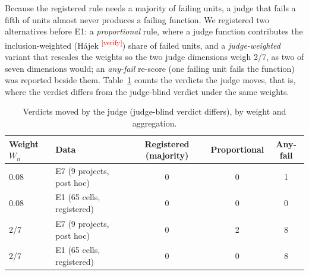 \documentclass[10pt,a4paper]{article}
\newcommand{\citeneeded}[1]{\cite{#1}\textsuperscript{\textcolor{red}{\tiny[verify]}}}
\newcommand{\Wn}{W_n}
\begin{document}
Because the registered rule needs a majority of failing units, a judge that fails a fifth of units almost never
produces a failing function. We registered two alternatives before E1: a \emph{proportional} rule, where a judge
function contributes the inclusion-weighted (H\'ajek \citeneeded{horvitz1952}) share of failed units, and a
\emph{judge-weighted} variant that rescales the weights so the two judge dimensions weigh 2/7, as two of seven
dimensions would; an \emph{any-fail} re-score (one failing unit fails the function) was reported beside them.
Table~\ref{tab:matter} counts the verdicts the judge moves, that is, where the verdict differs from the judge-blind
verdict under the same weights.

\begin{table}[t]
\centering
\small
\caption{Verdicts moved by the judge (judge-blind verdict differs), by weight and aggregation.}
\label{tab:matter}
\begin{tabular}{@{}llccc@{}}
\toprule
Weight $\Wn$ & Data & Registered (majority) & Proportional & Any-fail \\
\midrule
0.08 & E7 (9 projects, post hoc)  & 0 & 0 & 1 \\
0.08 & E1 (65 cells, registered)  & 0 & 0 & 0 \\
2/7  & E7 (9 projects, post hoc)  & 0 & 2 & 8 \\
2/7  & E1 (65 cells, registered)  & 0 & 0 & 8 \\
\bottomrule
\end{tabular}
\end{table}
\end{document}
